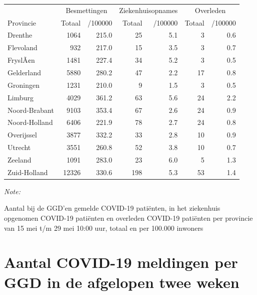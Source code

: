 \documentclass[
  english,
  man,floatsintext]{apa6}
\begin{document}
\begin{table}
\centering
\begin{threeparttable}
\begin{tabular}{lrrrrrr}
\toprule
\multicolumn{1}{c}{ } & \multicolumn{2}{c}{Besmettingen} & \multicolumn{2}{c}{Ziekenhuisopnames} & \multicolumn{2}{c}{Overleden} \\
\cmidrule(l{3pt}r{3pt}){2-3} \cmidrule(l{3pt}r{3pt}){4-5} \cmidrule(l{3pt}r{3pt}){6-7}
Provincie & Totaal & /100000 & Totaal & /100000 & Totaal & /100000\\
\midrule
Drenthe & 1064 & 215.0 & 25 & 5.1 & 3 & 0.6\\
Flevoland & 932 & 217.0 & 15 & 3.5 & 3 & 0.7\\
FryslÃ¢n & 1481 & 227.4 & 34 & 5.2 & 3 & 0.5\\
Gelderland & 5880 & 280.2 & 47 & 2.2 & 17 & 0.8\\
Groningen & 1231 & 210.0 & 9 & 1.5 & 3 & 0.5\\
Limburg & 4029 & 361.2 & 63 & 5.6 & 24 & 2.2\\
Noord-Brabant & 9103 & 353.4 & 67 & 2.6 & 24 & 0.9\\
Noord-Holland & 6406 & 221.9 & 78 & 2.7 & 24 & 0.8\\
Overijssel & 3877 & 332.2 & 33 & 2.8 & 10 & 0.9\\
Utrecht & 3551 & 260.8 & 52 & 3.8 & 10 & 0.7\\
Zeeland & 1091 & 283.0 & 23 & 6.0 & 5 & 1.3\\
Zuid-Holland & 12326 & 330.6 & 198 & 5.3 & 53 & 1.4\\
\bottomrule
\end{tabular}
\begin{tablenotes}
\item \textit{Note: } 
\item Aantal bij de GGD’en gemelde COVID-19 patiënten, in het ziekenhuis opgenomen COVID-19 patiënten en overleden COVID-19 patiënten per provincie van 15 mei t/m 29 mei 10:00 uur, totaal en per 100.000 inwoners
\end{tablenotes}
\end{threeparttable}
\end{table}

\newpage

\hypertarget{aantal-covid-19-meldingen-per-ggd-in-de-afgelopen-twee-weken}{%
\section{Aantal COVID-19 meldingen per GGD in de afgelopen twee weken}\label{aantal-covid-19-meldingen-per-ggd-in-de-afgelopen-twee-weken}}
\end{document}
